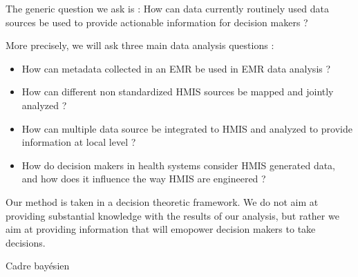 The generic question we ask is : How can data currently routinely used data sources be used to provide actionable information for decision makers ?

More precisely, we will ask three main data analysis questions :
\begin{itemize}
\item How can metadata collected in an EMR be used in EMR data analysis ?
\item How can different non standardized HMIS sources be mapped and jointly analyzed ?
\item How can multiple data source be integrated to HMIS and analyzed to provide information at local level ?
\item How do decision makers in health systems consider HMIS generated data, and how does it influence the way HMIS are engineered ?
\end{itemize}





Our method is taken in a decision theoretic framework. We do not aim at providing substantial knowledge with the results of our analysis, but rather we aim at providing information that will emopower decision makers to take decisions.

Cadre bayésien %

